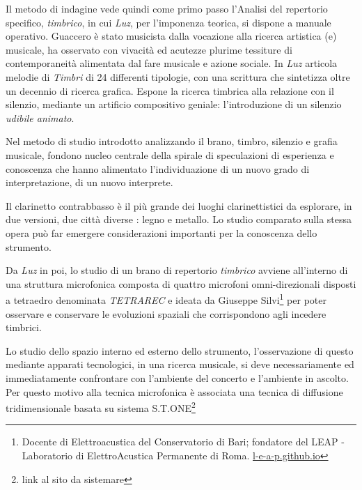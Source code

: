 \documentclass{gs-adonis}
\begin{document}

Il metodo di indagine vede quindi come primo passo l'Analisi del repertorio
specifico, \emph{timbrico}, in cui \emph{Luz}, per l'imponenza teorica, si
dispone a manuale operativo. Guaccero è stato musicista dalla vocazione alla
ricerca artistica (e) musicale, ha osservato con vivacità ed acutezze plurime
tessiture di contemporaneità alimentata dal fare musicale e azione sociale.
In \emph{Luz} articola melodie di \emph{Timbri} di 24 differenti tipologie, con
una scrittura che sintetizza oltre un decennio di ricerca grafica. Espone la
ricerca timbrica alla relazione con il silenzio, mediante un artificio
compositivo geniale: l'introduzione di un silenzio \emph{udibile animato}.

Nel metodo di studio introdotto analizzando il brano, timbro, silenzio e grafia
musicale, fondono nucleo centrale della spirale di speculazioni di esperienza e
conoscenza che hanno alimentato l'individuazione di un nuovo grado di
interpretazione, di un nuovo interprete.

Il clarinetto contrabbasso è il più grande dei luoghi clarinettistici da esplorare,
in due versioni, due città diverse \cite{netti23}: legno e metallo. Lo studio
comparato sulla stessa opera può far emergere considerazioni importanti per la
conoscenza dello strumento.

Da \emph{Luz} in poi, lo studio di un brano di repertorio \emph{timbrico}
avviene all'interno di una struttura microfonica composta di quattro microfoni
omni-direzionali disposti a tetraedro denominata \emph{TETRAREC} e ideata da
Giuseppe Silvi\footnote{%
  Docente di Elettroacustica del Conservatorio di Bari; fondatore del LEAP -
  Laboratorio di ElettroAcustica Permanente di Roma.
  \url{l-e-a-p.github.io}
} per poter osservare e conservare le evoluzioni spaziali che corrispondono agli
incedere timbrici.

Lo studio dello spazio interno ed esterno dello strumento, l'osservazione di
questo mediante apparati tecnologici, in una ricerca musicale, si deve
necessariamente ed immediatamente confrontare con l'ambiente del concerto e
l'ambiente in ascolto. Per questo motivo alla tecnica microfonica è associata
una tecnica di diffusione tridimensionale basata su sistema S.T.ONE\footnote{%
  link al sito da sistemare
}
\end{document}
